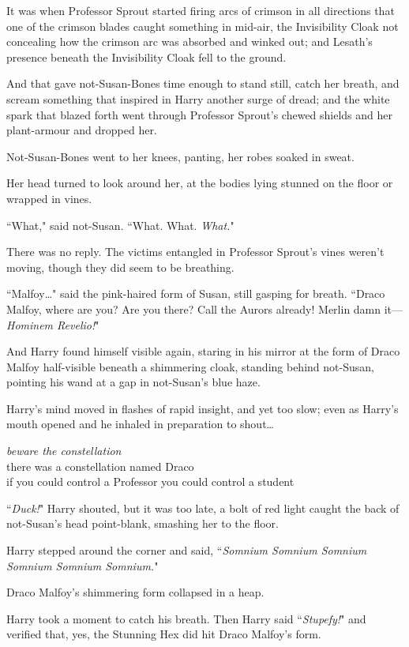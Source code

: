 It was when Professor Sprout started firing arcs of crimson in all directions that one of the crimson blades caught something in mid-air, the Invisibility Cloak not concealing how the crimson arc was absorbed and winked out; and Lesath's presence beneath the Invisibility Cloak fell to the ground.

And that gave not-Susan-Bones time enough to stand still, catch her breath, and scream something that inspired in Harry another surge of dread; and the white spark that blazed forth went through Professor Sprout's chewed shields and her plant-armour and dropped her.

Not-Susan-Bones went to her knees, panting, her robes soaked in sweat.

Her head turned to look around her, at the bodies lying stunned on the floor or wrapped in vines.

``What," said not-Susan. ``What. What. \emph{What.}"

There was no reply. The victims entangled in Professor Sprout's vines weren't moving, though they did seem to be breathing.

``Malfoy{\ldots}" said the pink-haired form of Susan, still gasping for breath. ``Draco Malfoy, where are you? Are you there? Call the Aurors already! Merlin damn it—\emph{Hominem Revelio!}"

And Harry found himself visible again, staring in his mirror at the form of Draco Malfoy half-visible beneath a shimmering cloak, standing behind not-Susan, pointing his wand at a gap in not-Susan's blue haze.

Harry's mind moved in flashes of rapid insight, and yet too slow; even as Harry's mouth opened and he inhaled in preparation to shout{\ldots}

\noindent{}\emph{beware the constellation}\\
there was a constellation named Draco\\
if you could control a Professor you could control a student

``\emph{Duck!}" Harry shouted, but it was too late, a bolt of red light caught the back of not-Susan's head point-blank, smashing her to the floor.

Harry stepped around the corner and said, ``\emph{Somnium Somnium Somnium Somnium Somnium Somnium.}"

Draco Malfoy's shimmering form collapsed in a heap.

Harry took a moment to catch his breath. Then Harry said ``\emph{Stupefy!}" and verified that, yes, the Stunning Hex did hit Draco Malfoy's form.

